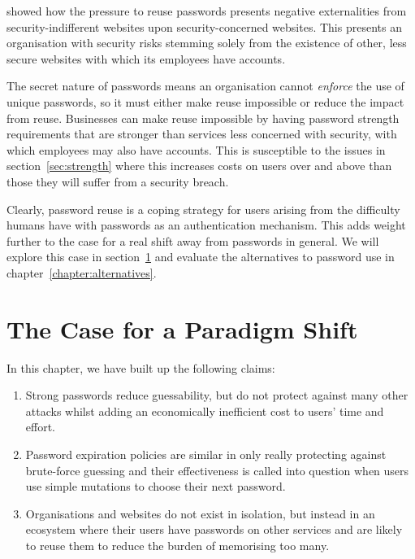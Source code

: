 \documentclass{report}
\begin{document}
\textcite{preibusch2010password} showed how the pressure to reuse passwords
presents negative externalities from security-indifferent websites upon
security-concerned websites. This presents an organisation with
security risks stemming solely from the existence of other, less
secure websites with which its employees have accounts.

The secret nature of passwords means an organisation cannot \emph{enforce}
the use of unique passwords, so it must either make reuse impossible or
reduce the impact from reuse. Businesses can make reuse impossible
by having password strength requirements that are stronger than
services less concerned with security, with which employees may also have
accounts. This is susceptible to the issues in section~\ref{sec:strength}
where this increases costs on users over and above than those they will
suffer from a security breach.

Clearly, password reuse is a coping strategy for users arising from the
difficulty humans have with passwords as an authentication mechanism. This
adds weight further to the case for a real shift away from passwords in
general. We will explore this case in section~\ref{sec:case} and evaluate
the alternatives to password use in chapter~\ref{chapter:alternatives}.

\section{The Case for a Paradigm Shift}
\label{sec:case}

In this chapter, we have built up the following claims:

\begin{enumerate}
  \item Strong passwords reduce guessability, but do not protect against
    many other attacks whilst adding an economically inefficient cost to users'
    time and effort.
  \item Password expiration policies are similar in only really protecting against
    brute-force guessing and their effectiveness is called into question when
    users use simple mutations to choose their next password.
  \item Organisations and websites do not exist in isolation, but instead in
    an ecosystem where their users have passwords on other services and are likely
    to reuse them to reduce the burden of memorising too many.
\end{enumerate}
\end{document}
